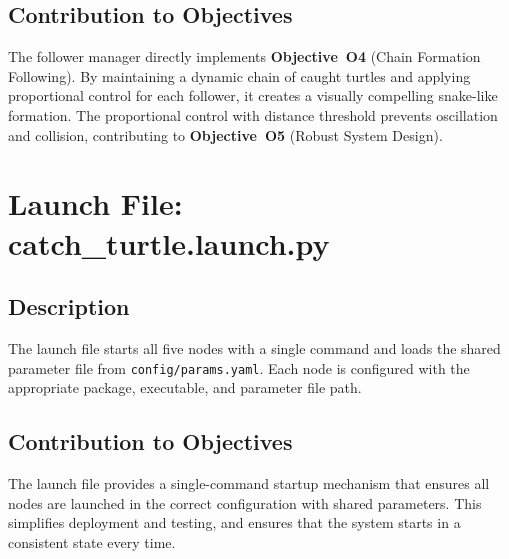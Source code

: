 \subsection{Contribution to Objectives}

The follower manager directly implements \textbf{Objective~O4} (Chain Formation Following). By maintaining a dynamic chain of caught turtles and applying proportional control for each follower, it creates a visually compelling snake-like formation. The proportional control with distance threshold prevents oscillation and collision, contributing to \textbf{Objective~O5} (Robust System Design).

\section{Launch File: catch\_turtle.launch.py}

\subsection{Description}

The launch file starts all five nodes with a single command and loads the shared parameter file from \texttt{config/params.yaml}. Each node is configured with the appropriate package, executable, and parameter file path.

\subsection{Contribution to Objectives}

The launch file provides a single-command startup mechanism that ensures all nodes are launched in the correct configuration with shared parameters. This simplifies deployment and testing, and ensures that the system starts in a consistent state every time.
